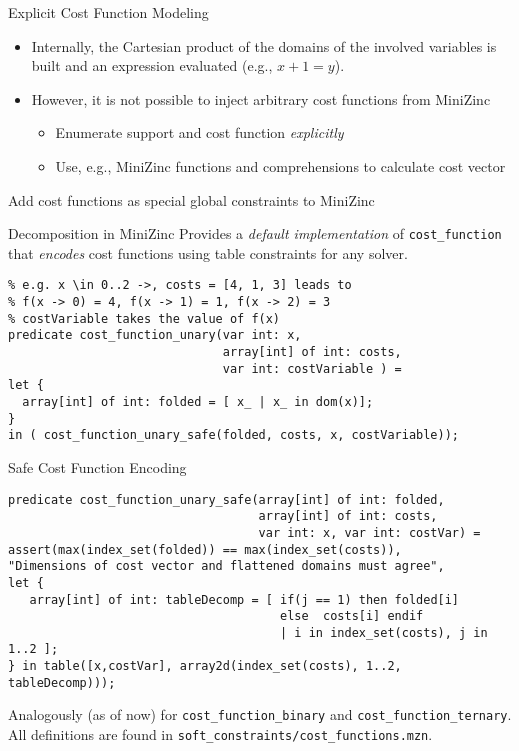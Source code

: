 \documentclass[handout,10pt,xcolor={dvipsnames},fleqn]{beamer}
\begin{document}
\begin{frame}{Explicit Cost Function Modeling}
\begin{itemize}
\item Internally, the Cartesian product of the domains 
of the involved variables is built and an expression evaluated (e.g., $x + 1 = y$).
\item However, it is not possible to inject arbitrary cost functions from MiniZinc
\begin{itemize}
\item Enumerate support and cost function \emph{explicitly}
\item Use, e.g., MiniZinc functions and comprehensions to calculate cost vector
\end{itemize}
\end{itemize}
\begin{parchment}[Proposal]
\alert{Add cost functions as special global constraints to MiniZinc}
\end{parchment}
\end{frame}

\begin{frame}[fragile]{Decomposition in MiniZinc}
Provides a \emph{default implementation} of \texttt{cost\_function} that \emph{encodes}
cost functions using table constraints for any solver.
\small
\begin{lstlisting}
% e.g. x \in 0..2 ->, costs = [4, 1, 3] leads to 
% f(x -> 0) = 4, f(x -> 1) = 1, f(x -> 2) = 3
% costVariable takes the value of f(x)
predicate cost_function_unary(var int: x, 
                              array[int] of int: costs, 
                              var int: costVariable ) = 
let {
  array[int] of int: folded = [ x_ | x_ in dom(x)];
}
in ( cost_function_unary_safe(folded, costs, x, costVariable)); 
\end{lstlisting}
\end{frame}

\begin{frame}[fragile]{Safe Cost Function Encoding}
\small
\begin{lstlisting}
predicate cost_function_unary_safe(array[int] of int: folded, 
                                   array[int] of int: costs, 
                                   var int: x, var int: costVar) = 
assert(max(index_set(folded)) == max(index_set(costs)), 
"Dimensions of cost vector and flattened domains must agree", 
let {
   array[int] of int: tableDecomp = [ if(j == 1) then folded[i] 
                                      else  costs[i] endif 
                                      | i in index_set(costs), j in 1..2 ];
} in table([x,costVar], array2d(index_set(costs), 1..2, tableDecomp)));
\end{lstlisting}
Analogously (as of now) for \texttt{cost\_function\_binary} and \texttt{cost\_function\_ternary}.
All definitions are found in \texttt{soft\_constraints/cost\_functions.mzn}.
\end{frame}
\end{document}
